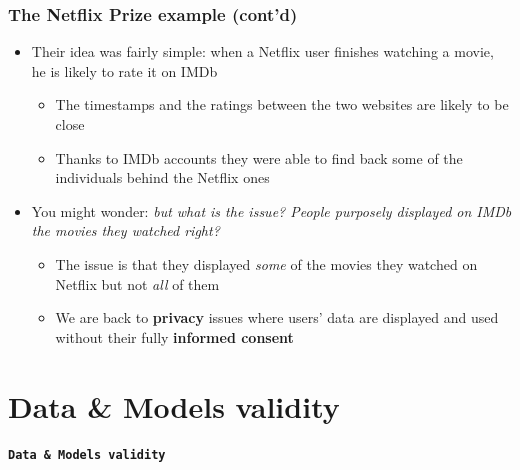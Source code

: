 \documentclass{beamer}
\newenvironment{colorblock}[2]
{\setbeamercolor{item}{fg=#1,bg=#1}\begin{beamerboxesrounded}[upper=#1,lower=#2,shadow=true]}
  {\end{beamerboxesrounded}}
\begin{document}
\begin{frame}\frametitle{The Netflix Prize example (cont'd)}
\begin{itemize}
	\setlength\itemsep{1em}
	\item Their idea was fairly simple: when a Netflix user finishes watching a movie, he is likely to rate it on IMDb
	\begin{itemize}
		\item The timestamps and the ratings between the two websites are likely to be close
		\item Thanks to IMDb accounts they were able to find back some of the individuals behind the Netflix ones
	\end{itemize}
	\item You might wonder: \textit{but what is the issue? People purposely displayed on IMDb the movies they watched right?}
	\begin{itemize}
		\item The issue is that they displayed \textit{some} of the movies they watched on Netflix but not \textit{all} of them
		\item We are back to {\bf privacy} issues where users' data are displayed and used without their fully {\bf informed consent}
	\end{itemize}
\end{itemize}
\end{frame}

\section{Data \& Models validity}

\begin{frame}
 \begin{colorblock}{blue}{lightblue}{ }
  \begin{center}
    \Huge \textbf{\texttt{Data \& Models validity}}
  \end{center}
  \end{colorblock}
\end{frame}
\end{document}
